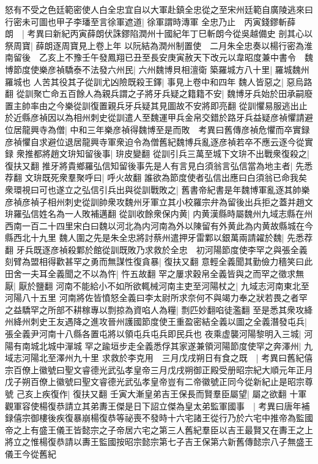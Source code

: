 怒有不受之色廷範密使人白全忠宜自以大軍赴鎮全忠從之至宋州廷範自廣陵逃來曰行密未可圖也甲子李璠至言徐軍遮道|{
	徐軍謂時漙軍}
全忠乃止　丙寅錢鏐斬薛朗　|{
	考異曰新紀丙寅薛朗伏誅鏐陷潤州十國紀年丁巳斬朗今從吳越備史}
剖其心以祭周寶|{
	薛朗逐周寶見上卷上年}
以阮結為潤州制置使　二月朱全忠奏以楊行密為淮南留後　乙亥上不豫壬午發鳳翔已丑至長安庚寅赦天下改元以韋昭度兼中書令　魏博節度使樂彦禎驕泰不法發六州民|{
	六州魏博貝相澶衛}
築羅城方八十里|{
	羅城魏州羅城也}
人苦其役其子從訓尤凶險既殺王鐸|{
	事見上卷中和四年}
魏人皆惡之|{
	惡烏路翻}
從訓聚亡命五百餘人為親兵謂之子將牙兵疑之籍籍不安|{
	魏博牙兵始於田承嗣廢置主帥率由之今樂從訓復置親兵牙兵疑其見圖故不安將即亮翻}
從訓懼易服逃出止於近縣彦禎因以為相州刺史從訓遣人至魏運甲兵金帛交錯於路牙兵益疑彦禎懼請避位居龍興寺為僧|{
	中和三年樂彦禎得魏博至是而敗　考異曰舊傳彦禎危懼而卒實録彦禎懼自求避位退居龍興寺軍衆迫令為僧舊紀魏博兵亂逐彦禎若卒不應云逐今從實録}
衆推都將趙文㺹知留後事|{
	㺹皮變翻}
從訓引兵三萬至城下文㺹不出戰衆復殺之|{
	復扶又翻}
推牙將貴鄉羅弘信知留後事先是人有言見白須翁言弘信當為地主者|{
	先悉荐翻}
文㺹既死衆羣聚呼曰|{
	呼火故翻}
誰欲為節度使者弘信出應曰白須翁已命我矣衆環視曰可也遂立之弘信引兵出與從訓戰敗之|{
	舊書帝紀書是年魏博軍亂逐其帥樂彦禎彦禎子相州刺史從訓帥衆攻魏州牙軍立其小校羅宗弁為留後出兵拒之蓋并趙文㺹羅弘信姓名為一人敗補邁翻}
從訓收餘衆保内黄|{
	内黄漢縣時屬魏州九域志縣在州西南一百二十四里宋白曰魏以河北為内河南為外以陳留有外黄此為内黄故縣城在今縣西北十九里}
魏人圍之先是朱全忠將討蔡州遣押牙雷鄴以銀萬兩請糴於魏|{
	先悉荐翻}
牙兵既逐彦禎殺鄴於館從訓既敗乃求救於全忠　初河陽節度使李罕之與張全義刻臂為盟相得歡甚罕之勇而無謀性復貪暴|{
	復扶又翻}
意輕全義聞其勤儉力穡笑曰此田舍一夫耳全義聞之不以為忤|{
	忤五故翻}
罕之屢求穀帛全義皆與之而罕之徵求無厭|{
	厭於鹽翻}
河南不能給小不如所欲輒械河南主吏至河陽杖之|{
	九域志河南東北至河陽八十五里}
河南將佐皆憤怒全義曰李太尉所求奈何不與竭力奉之狀若畏之者罕之益驕罕之所部不耕稼專以剽掠為資啗人為糧|{
	剽匹妙翻啗徒濫翻}
至是悉其衆攻絳州絳州刺史王友遇降之進攻晉州護國節度使王重盈密結全義以圖之全義潛發屯兵|{
	張全義尹河南十八縣各置屯將以領屯兵屯兵即民兵也}
夜乘虚襲河陽黎明入三城|{
	河陽有南城北城中潬城}
罕之踰垣步走全義悉俘其家遂兼領河陽節度使罕之奔澤州|{
	九域志河陽北至澤州九十里}
求救於李克用　三月戊戌朔日有食之既　|{
	考異曰舊紀僖宗百僚上徽號曰聖文睿德光武弘孝皇帝三月戊戌朔御正殿受册昭宗紀大順元年正月戊子朔百僚上徽號曰聖文睿德光武弘孝皇帝豈有二帝徽號正同今從新紀止是昭宗尊號}
己亥上疾復作|{
	復扶又翻}
壬寅大漸皇弟吉王保長而賢羣臣屬望|{
	屬之欲翻}
十軍觀軍容使楊復恭請立其弟夀王傑是日下詔立傑為皇太弟監軍國事　|{
	考異曰唐年補録僖宗御樓後疾復暴崩楊復恭等祕喪不發時十六宅諸王從行乃於六宅中推帝為監國帝之上有盛王儀王皆懿宗之子帝居六宅之第三人舊紀羣臣以吉王最賢又在夀王之上將立之惟楊復恭請以夀王監國按昭宗懿宗第七子吉王保第六新舊傳懿宗八子無盛王儀王今從舊紀}
